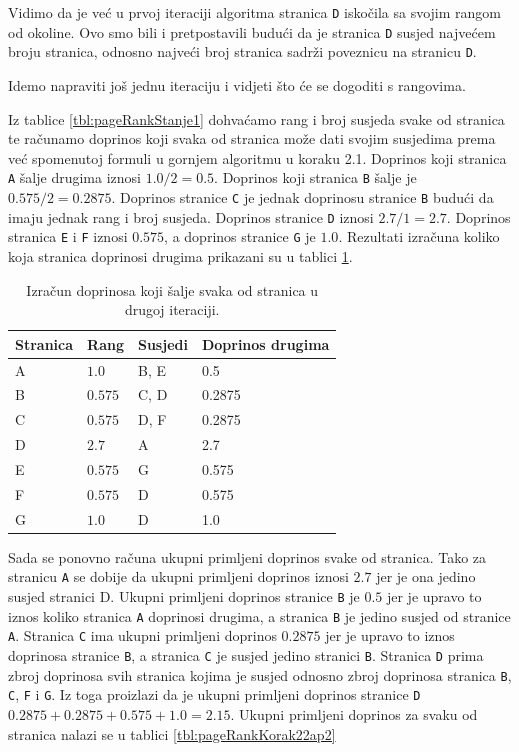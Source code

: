 \documentclass[times, utf8, zavrsni, numeric]{fer}
\begin{document}
Vidimo da je već u prvoj iteraciji algoritma stranica \texttt{D} iskočila sa svojim rangom od okoline. Ovo smo bili i pretpostavili budući da je stranica \texttt{D} susjed najvećem broju stranica, odnosno najveći broj stranica sadrži poveznicu na stranicu \texttt{D}. 

Idemo napraviti još jednu iteraciju i vidjeti što će se dogoditi s rangovima. 

Iz tablice \ref{tbl:pageRankStanje1} dohvaćamo rang i broj susjeda svake od stranica te računamo doprinos koji svaka od stranica može dati svojim susjedima prema već spomenutoj formuli u gornjem algoritmu u koraku 2.1. Doprinos koji stranica \texttt{A} šalje drugima iznosi $1.0 / 2 = 0.5$. Doprinos koji stranica \texttt{B} šalje je $0.575 / 2 = 0.2875$. Doprinos stranice \texttt{C} je jednak doprinosu stranice \texttt{B} budući da imaju jednak rang i broj susjeda. Doprinos stranice \texttt{D} iznosi $2.7 / 1 = 2.7$. Doprinos stranica \texttt{E} i \texttt{F} iznosi $0.575$, a doprinos stranice \texttt{G} je $1.0$. Rezultati izračuna koliko koja stranica doprinosi drugima prikazani su u tablici \ref{tbl:pageRankKorak21p2}.

\begin{table}[htb]
\caption{Izračun doprinosa koji šalje svaka od stranica u drugoj iteraciji.}
\label{tbl:pageRankKorak21p2}
\centering
\begin{tabular}{llll} 
\hline
Stranica & Rang & Susjedi & Doprinos drugima\\
\hline
A & $1.0$ & B, E & 0.5\\
B & $0.575$ & C, D & 0.2875\\
C & $0.575$ & D, F & 0.2875\\
D & $2.7$ & A & 2.7\\
E & $0.575$ & G & 0.575\\
F & $0.575$ & D & 0.575\\
G & $1.0$ & D & 1.0\\
\hline
\end{tabular}
\end{table}

Sada se ponovno računa ukupni primljeni doprinos svake od stranica. Tako za stranicu \texttt{A} se dobije da ukupni primljeni doprinos iznosi $2.7$ jer je ona jedino susjed stranici D. Ukupni primljeni doprinos stranice \texttt{B} je $0.5$ jer je upravo to iznos koliko stranica \texttt{A} doprinosi drugima, a stranica \texttt{B} je jedino susjed od stranice \texttt{A}. Stranica \texttt{C} ima ukupni primljeni doprinos $0.2875$ jer je upravo to iznos doprinosa stranice \texttt{B}, a stranica \texttt{C} je susjed jedino stranici \texttt{B}. Stranica \texttt{D} prima zbroj doprinosa svih stranica kojima je susjed odnosno zbroj doprinosa stranica \texttt{B}, \texttt{C}, \texttt{F} i \texttt{G}. Iz toga proizlazi da je ukupni primljeni doprinos stranice \texttt{D} $0.2875 + 0.2875 + 0.575 + 1.0 = 2.15$. Ukupni primljeni doprinos za svaku od stranica nalazi se u tablici \ref{tbl:pageRankKorak22ap2} 
\end{document}
